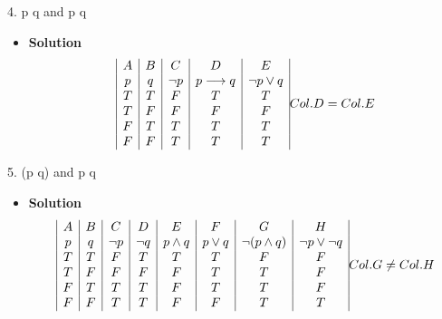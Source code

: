 \documentclass[11pt]{article}
\begin{document}
\begin{itemize}
\begin{flushleft}
{\large 4. p \rightarrow q \hspace{.2cm} and \hspace{.2cm} \neg p \lor  q}
\end{flushleft}

\begin{itemize}

\item \textbf{Solution}\\

\begin{displaymath}
\begin{array}{|c|c|c|c|c|c|}
A & B & C & D & E\\
p & q & \neg  p &  p \longrightarrow q &  \neg p \lor q \\ 
T & T & F & T & T  \\
T & F & F & F & F \\
F & T & T & T & T \\
F & F & T & T & T \\
\end{array}
Col. D = Col. E\\
\end{displaymath}

\end{itemize}





\begin{flushleft}
{\large 5. \neg (p \land q)\hspace{.2cm} and\hspace{.2cm} \neg p \lor \neg q}\\
\end{flushleft}

\begin{itemize}

\item \textbf{Solution}\\

\begin{displaymath}
\begin{array}{|c|c|c|c|c|c|c|c|}
A & B & C & D & E &F & G & H\\
p & q & \neg  p &  \neg q & p \land q & p \lor q & \neg(p\land q) & \neg p \lor \neg q \\ 
T & T & F & T & T & T & F & F\\
T & F & F & F & F & T & T & F\\
F & T & T & T & F & T & T & F\\
F & F & T & T & F & F & T & T\\
\end{array}
Col. G \neq Col. H\\
\end{displaymath}

\end{itemize}

\end{itemize}
\end{document}
